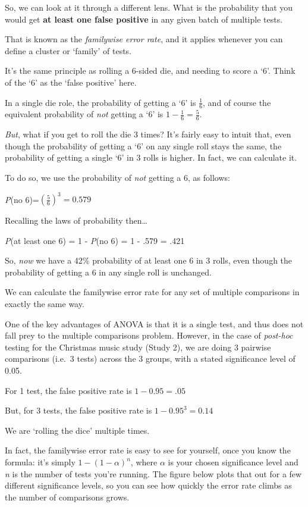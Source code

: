\documentclass[
]{book}
\begin{document}
So, we can look at it through a different lens. What is the probability that you would get \textbf{at least one false positive} in any given batch of multiple tests.

That is known as the \emph{familywise error rate}, and it applies whenever you can define a cluster or `family' of tests.

It's the same principle as rolling a 6-sided die, and needing to score a `6'. Think of the `6' as the `false positive' here.

In a single die role, the probability of getting a `6' is \(\frac{1}{6}\), and of course the equivalent probability of \emph{not} getting a `6' is \(1-\frac{1}{6}=\frac{5}{6}\).

\emph{But}, what if you get to roll the die 3 times? It's fairly easy to intuit that, even though the probability of getting a `6' on any single roll stays the same, the probability of getting a single `6' in 3 rolls is higher. In fact, we can calculate it.

To do so, we use the probability of \emph{not} getting a 6, as follows:

\emph{P}(no 6)=\((\frac{5}{6})^{3} = 0.579\)

Recalling the laws of probability then\ldots{}

\emph{P}(at least one 6) = 1 - \emph{P}(no 6) = 1 - .579 = .421

So, \emph{now} we have a 42\% probability of at least one 6 in 3 rolls, even though the probability of getting a 6 in any single roll is unchanged.

We can calculate the familywise error rate for any set of multiple comparisons in exactly the same way.

One of the key advantages of ANOVA is that it is a single test, and thus does not fall prey to the multiple comparisons problem. However, in the case of \emph{post-hoc} testing for the Christmas music study (Study 2), we are doing 3 pairwise comparisons (i.e.~3 tests) across the 3 groups, with a stated significance level of 0.05.

For 1 test, the false positive rate is \(1 - 0.95 = .05\)

But, for 3 tests, the false positive rate is \(1-0.95^{3}=0.14\)

We are `rolling the dice' multiple times.

In fact, the familywise error rate is easy to see for yourself, once you know the formula: it's simply \(1-(1-\alpha)^n\), where \(\alpha\) is your chosen significance level and \emph{n} is the number of tests you're running. The figure below plots that out for a few different significance levels, so you can see how quickly the error rate climbs as the number of comparisons grows.
\end{document}
